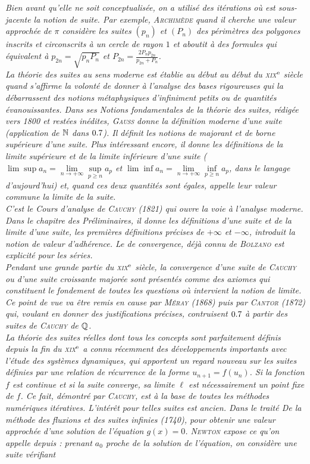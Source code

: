 \textsl{
Bien avant qu'elle ne soit conceptualisée, on a utilisé des itérations où est sous-jacente la notion de suite. Par exemple, \textsc{Archimède} quand il cherche une valeur approchée de $\pi$ considère les suites $(p_n)$ et $(P_n)$ des périmètres des polygones inscrits et circonscrits à un cercle de rayon $1$ et aboutit à des formules qui équivalent à $p_{2n} = \sqrt{p_n P_n}$ et $P_{2n} = \frac{2 P_n p_{2n}}{p_{2n} + P_n}$. \\
La théorie des suites au sens moderne est établie au début au début du \textsc{xix}$^{\mathrm{e}}$ siècle quand s'affirme la volonté de donner à l'analyse des bases rigoureuses qui la débarrassent des notions métaphysiques d'infiniment petits ou de quantités évanouissantes. Dans ses \emph{Notions fondamentales de la théorie des suites}, rédigée vers 1800 et restées inédites, \textsc{Gauss} donne la définition moderne d'une suite (application de $\mathbb{N}$ dans $0.7$). Il définit les notions de majorant et de borne supérieure d'une suite. Plus intéressant encore, il donne les définitions de la limite supérieure et de la limite inférieure d'une suite ($\lim \sup a_n = \lim\limits_{n \to + \infty} \sup\limits_{p \geqslant n} a_p$ et $\lim \inf a_n = \lim\limits_{n \to + \infty} \inf\limits_{p \geqslant n} a_p$, dans le langage d'aujourd'hui) et, quand ces deux quantités sont égales, appelle leur valeur commune la limite de la suite. \\
C'est le \emph{Cours d'analyse} de \textsc{Cauchy} (1821) qui ouvre la voie à l'analyse moderne. Dans le chapitre des \emph{Préliminaires}, il donne les définitions d'une suite et de la limite d'une suite, les premières définitions précises de $+\infty$ et $-\infty$, introduit la notion de valeur d'adhérence. Le  de convergence, déjà connu de \textsc{Bolzano} est explicité pour les séries. \\
Pendant une grande partie du \textsc{xix}$^{\mathrm{e}}$ siècle, la convergence d'une suite de \textsc{Cauchy} ou d'une suite croissante majorée sont présentés comme des axiomes qui constituent le fondement de toutes les questions où intervient la notion de limite. Ce point de vue va être remis en cause par \textsc{Méray} (1868) puis par \textsc{Cantor} (1872) qui, voulant en donner des justifications précises, contruisent $0.7$ à partir des suites de \textsc{Cauchy} de $\mathbb{Q}$. \\
La théorie des suites réelles dont tous les concepts sont parfaitement définis depuis la fin du \textsc{xix}$^{\mathrm{e}}$ a connu récemment des développements importants avec l'étude des systèmes dynamiques, qui apportent un regard nouveau sur les suites définies par une relation de récurrence de la forme $u_{n+1} = f(u_n)$. Si la fonction $f$ est continue et si la suite converge, sa limite $\ell$ est nécessairement un point fixe de $f$. Ce fait, démontré par \textsc{Cauchy}, est à la base de toutes les méthodes numériques itératives. L'intérêt pour telles suites est ancien. Dans le traité \emph{De la méthode des fluxions et des suites infinies} (1740), pour obtenir une valeur approchée d'une solution de l'équation $g(x) = 0$. \textsc{Newton} expose ce qu'on appelle depuis : prenant $a_0$ proche de la solution de l'équation, on considère une suite vérifiant 
}
